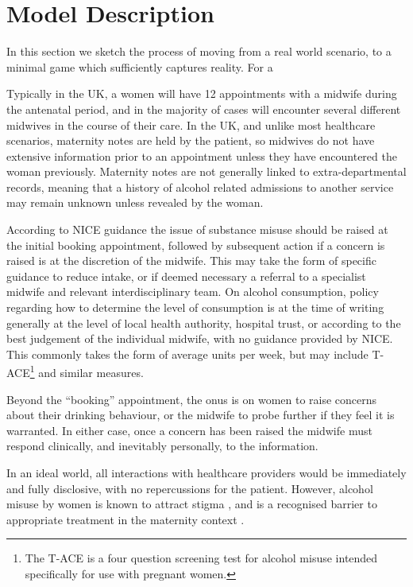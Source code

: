 \section{Model Description}
\label{app:model_description}

In this section we sketch the process of moving from a real world scenario, to a minimal game which sufficiently captures reality. For a

Typically in the UK, a women will have 12 appointments with a midwife during the antenatal period, and in the majority of cases will encounter several different midwives \citep{Redshaw2014} in the course of their care. In the UK, and unlike most healthcare scenarios, maternity notes are held by the patient, so midwives do not have extensive information prior to an appointment unless they have encountered the woman previously. Maternity notes are not generally linked to extra-departmental records, meaning that a history of alcohol related admissions to another service may remain unknown unless revealed by the woman.

According to NICE guidance \citep{NICE2010a,NICE2010} the issue of substance misuse should be raised at the initial booking appointment, followed by subsequent action if a concern is raised is at the discretion of the midwife. This may take the form of specific guidance to reduce intake, or if deemed necessary a referral to a specialist midwife and relevant interdisciplinary team. On alcohol consumption, policy regarding how to determine the level of consumption is at the time of writing generally at the level of local health authority, hospital trust, or according to the best judgement of the individual midwife, with no guidance provided by NICE. This commonly takes the form of average units per week, but may include \ac{T-ACE}\footnote{The \ac{T-ACE} is a four question screening test for alcohol misuse intended specifically for use with pregnant women.} \citep{Sokol1989863} and similar measures. 

Beyond the \enquote{booking} appointment, the onus is on women to raise concerns about their drinking behaviour, or the midwife to probe further if they feel it is warranted. In either case, once a concern has been raised the midwife must respond clinically, and inevitably personally, to the information.

In an ideal world, all interactions with healthcare providers would be immediately and fully disclosive, with no repercussions for the patient. However, alcohol misuse by women is known to attract stigma \citep{Gomberg1988}, and is a recognised barrier to appropriate treatment in the maternity context \citep{NICE2010,Radcliffe2011}.

